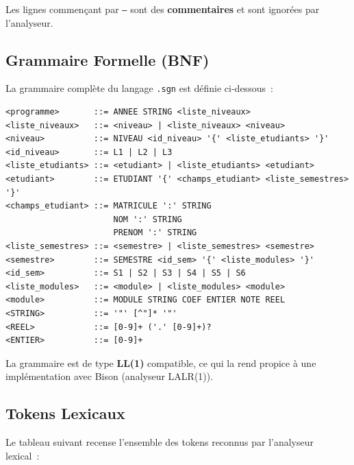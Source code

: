 \documentclass[a4paper,12pt]{article}
\begin{document}
Les lignes commençant par \texttt{--} sont des \textbf{commentaires} et sont ignorées par l'analyseur.

\subsection{Grammaire Formelle (BNF)}

La grammaire complète du langage \texttt{.sgn} est définie ci-dessous~:

\begin{lstlisting}[caption={Grammaire BNF du langage .sgn}, style=sgn, label=lst:bnf]
<programme>       ::= ANNEE STRING <liste_niveaux>
<liste_niveaux>   ::= <niveau> | <liste_niveaux> <niveau>
<niveau>          ::= NIVEAU <id_niveau> '{' <liste_etudiants> '}'
<id_niveau>       ::= L1 | L2 | L3
<liste_etudiants> ::= <etudiant> | <liste_etudiants> <etudiant>
<etudiant>        ::= ETUDIANT '{' <champs_etudiant> <liste_semestres> '}'
<champs_etudiant> ::= MATRICULE ':' STRING
                      NOM ':' STRING
                      PRENOM ':' STRING
<liste_semestres> ::= <semestre> | <liste_semestres> <semestre>
<semestre>        ::= SEMESTRE <id_sem> '{' <liste_modules> '}'
<id_sem>          ::= S1 | S2 | S3 | S4 | S5 | S6
<liste_modules>   ::= <module> | <liste_modules> <module>
<module>          ::= MODULE STRING COEF ENTIER NOTE REEL
<STRING>          ::= '"' [^"]* '"'
<REEL>            ::= [0-9]+ ('.' [0-9]+)?
<ENTIER>          ::= [0-9]+
\end{lstlisting}

La grammaire est de type \textbf{LL(1)} compatible, ce qui la rend propice à une implémentation avec Bison (analyseur LALR(1)).

\subsection{Tokens Lexicaux}

Le tableau suivant recense l'ensemble des tokens reconnus par l'analyseur lexical~:
\end{document}
